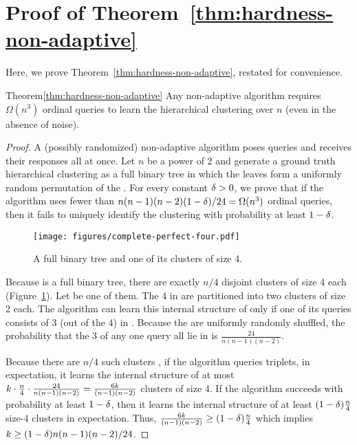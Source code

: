 
\section{Proof of Theorem~\ref{thm:hardness-non-adaptive}}
\label{sec:non-adaptive-lower-bound}

Here, we prove Theorem~\ref{thm:hardness-non-adaptive},
restated for convenience.

\begin{rtheorem}{Theorem}{\ref{thm:hardness-non-adaptive}}
Any non-adaptive algorithm requires $\Omega(n^3)$ ordinal queries
to learn the hierarchical clustering over $n$ \elements
(even in the absence of noise).
\end{rtheorem}

\begin{proof}
A (possibly randomized) non-adaptive algorithm poses \NumQuery queries
and receives their responses all at once.
Let $n$ be a power of $2$ and generate a ground truth
hierarchical clustering \TreeOpt as a full binary tree
in which the leaves form
a uniformly random permutation of the \elements. 
For every constant $\delta > 0$,
we prove that if the algorithm uses fewer than
$n (n - 1)(n - 2) (1 - \delta) / 24 = \Omega(n^3)$ ordinal queries,
then it fails to uniquely identify the clustering
with probability at least $1 - \delta$.

\begin{figure}[htb]
\begin{center}
\texttt{[image: figures/complete-perfect-four.pdf]}
\end{center}
\caption{A full binary tree and one of its clusters of size 4. \label{fig:complete-perfect-four}}
\end{figure}

Because \TreeOpt is a full binary tree,
there are exactly $n/4$ disjoint clusters of size 4 each
(Figure~\ref{fig:complete-perfect-four}).
Let \Cluster be one of them.
The 4 \elements in \Cluster are partitioned into two clusters
of size 2 each.
The algorithm can learn this internal structure of \Cluster
only if one of its queries consists of 3 (out of the 4) \elements in \Cluster.
Because the \elements are uniformly randomly shuffled,
the probability that the 3 \elements of any one query all lie in
\Cluster is $\frac{24}{n (n - 1)(n - 2)}$.

Because there are $n/4$ such clusters \Cluster, 
if the algorithm queries \NumQuery triplets,
in expectation, it learns the internal structure of at most
$k \cdot \frac{n}{4} \cdot \frac{24}{n (n - 1)(n - 2)}
= \frac{6k}{(n-1)(n-2)}$
clusters of size 4.
If the algorithm succeeds with probability at least $1 - \delta$,
then it learns the internal structure of at least
$(1 - \delta)\frac{n}{4}$ size-4 clusters in expectation.
Thus, $\frac{6k}{(n-1)(n-2)} \geq (1 - \delta)\frac{n}{4}$
which implies $k \geq (1 - \delta) n (n - 1) (n - 2) / 24$.
\end{proof}

